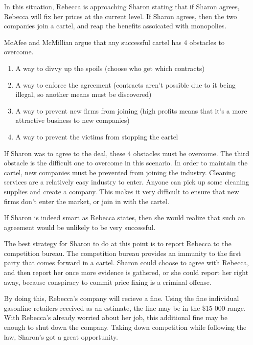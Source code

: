 \documentclass[12pt]{article}
\begin{document}
In this situation, Rebecca is approaching Sharon stating that if Sharon agrees, Rebecca will fix her prices at the current level. If Sharon agrees, then the two companies join a cartel, and reap the benefits assoicated with monopolies.

McAfee and McMillian\cite[pg. 1]{biddingRings} argue that any successful cartel has 4 obstacles to overcome. 

\begin{enumerate}
\item A way to divvy up the spoils (choose who get which contracts)
\item A way to enforce the agreement (contracts aren't possible due to it being illegal, so another means must be discovered)
\item A way to prevent new firms from joining (high profits means that it's a more attractive business to new companies)
\item A way to prevent the victims from stopping the cartel
\end{enumerate}

If Sharon was to agree to the deal, these 4 obstacles must be overcome. The third obstacle is the difficult one to overcome in this scenario. In order to maintain the cartel, new companies must be prevented from joining the industry. Cleaning services are a relatively easy industry to enter. Anyone can pick up some cleaning supplies and create a company. This makes it very difficult to ensure that new firms don't enter the market, or join in with the cartel.

If Sharon is indeed smart as Rebecca states, then she would realize that such an agreement would be unlikely to be very successful.

The best strategy for Sharon to do at this point is to report Rebecca to the competition bureau. The competition bureau provides an immunity \cite{immunity} to the first party that comes forward in a cartel. Sharon could choose to agree with Rebecca, and then report her once more evidence is gathered, or she could report her right away, because conspiracy to commit price fixing is a criminal offense.\cite[45.1.a]{compAct}

By doing this, Rebecca's company will recieve a fine. Using the fine individual gasonline retailers received as an estimate, the fine may be in the \$15 000  range.\cite[2013]{penalties} With Rebecca's already worried about her job, this additional fine may be enough to shut down the company. Taking down competition while following the law, Sharon's got a great opportunity.
\end{document}

